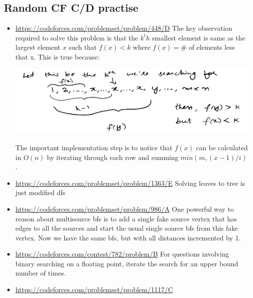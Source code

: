 \documentclass[titlepage, 12pt]{book}
\begin{document}
\subsection{Random CF C/D practise}
\begin{itemize}
  \item\url{https://codeforces.com/problemset/problem/448/D}
    The key observation required to solve this problem is that the $k^th$
    smallest element is same as the largest element $x$ such that $f(x) < k$
    where $f(x) = \#$ of elements less that x. This is true because:

    \includegraphics[scale=0.25]{cf448d}

    The important implementation step is to notice that $f(x)$ can be calculated
    in $O(n)$ by iterating through each row and summing $min(m, (x - 1) / i)$.
    
  \item\url{https://codeforces.com/problemset/problem/1363/E}
    Solving leaves to tree is just modified dfs

  \item\url{https://codeforces.com/problemset/problem/986/A}
    One powerful way to reason about multisource bfs is to add a single fake
    source vertex that has edges to all the sources and start the usual single
    source bfs from this fake vertex. Now we have the same bfs, but with all
    distances incremented by 1.

  \item\url{https://codeforces.com/contest/782/problem/B}
    For questions involving binary searching on a floating point, iterate the
    search for an upper bound number of times.

  \item\url{https://codeforces.com/problemset/problem/1117/C}
    
\end{itemize}
\end{document}
